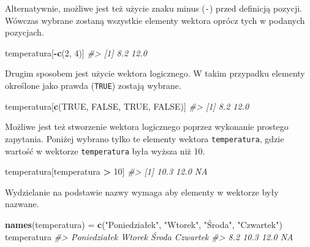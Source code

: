 \documentclass[paper=6in:9in,pagesize=pdftex,headinclude=on,footinclude=on,10pt]{scrbook}
\newenvironment{Shaded}{\begin{snugshade}}{\end{snugshade}}
\newcommand{\CommentTok}[1]{\textcolor[rgb]{0.56,0.35,0.01}{\textit{#1}}}
\newcommand{\DecValTok}[1]{\textcolor[rgb]{0.00,0.00,0.81}{#1}}
\newcommand{\KeywordTok}[1]{\textcolor[rgb]{0.13,0.29,0.53}{\textbf{#1}}}
\newcommand{\NormalTok}[1]{#1}
\newcommand{\OperatorTok}[1]{\textcolor[rgb]{0.81,0.36,0.00}{\textbf{#1}}}
\newcommand{\OtherTok}[1]{\textcolor[rgb]{0.56,0.35,0.01}{#1}}
\newcommand{\StringTok}[1]{\textcolor[rgb]{0.31,0.60,0.02}{#1}}
\begin{document}
Alternatywnie, możliwe jest też użycie znaku minus (\texttt{-}) przed definicją pozycji.
Wówczas wybrane zostaną wszystkie elementy wektora oprócz tych w podanych pozycjach.

\begin{Shaded}
\begin{Highlighting}[]
\NormalTok{temperatura[}\OperatorTok{-}\KeywordTok{c}\NormalTok{(}\DecValTok{2}\NormalTok{, }\DecValTok{4}\NormalTok{)]}
\CommentTok{#> [1]  8.2 12.0}
\end{Highlighting}
\end{Shaded}

Drugim sposobem jest użycie wektora logicznego.
W takim przypadku elementy określone jako prawda (\texttt{TRUE}) zostają wybrane.

\begin{Shaded}
\begin{Highlighting}[]
\NormalTok{temperatura[}\KeywordTok{c}\NormalTok{(}\OtherTok{TRUE}\NormalTok{, }\OtherTok{FALSE}\NormalTok{, }\OtherTok{TRUE}\NormalTok{, }\OtherTok{FALSE}\NormalTok{)]}
\CommentTok{#> [1]  8.2 12.0}
\end{Highlighting}
\end{Shaded}

Możliwe jest też stworzenie wektora logicznego poprzez wykonanie prostego zapytania.
Poniżej wybrano tylko te elementy wektora \texttt{temperatura}, gdzie wartość w wektorze \texttt{temperatura} była wyższa niż 10.

\begin{Shaded}
\begin{Highlighting}[]
\NormalTok{temperatura[temperatura }\OperatorTok{>}\StringTok{ }\DecValTok{10}\NormalTok{]}
\CommentTok{#> [1] 10.3 12.0   NA}
\end{Highlighting}
\end{Shaded}

Wydzielanie na podstawie nazwy wymaga aby elementy w wektorze były nazwane.

\begin{Shaded}
\begin{Highlighting}[]
\KeywordTok{names}\NormalTok{(temperatura) =}\StringTok{ }\KeywordTok{c}\NormalTok{(}\StringTok{"Poniedziałek"}\NormalTok{, }\StringTok{"Wtorek"}\NormalTok{, }\StringTok{"Środa"}\NormalTok{, }\StringTok{"Czwartek"}\NormalTok{)}
\NormalTok{temperatura}
\CommentTok{#> Poniedziałek       Wtorek        Środa     Czwartek }
\CommentTok{#>          8.2         10.3         12.0           NA}
\end{Highlighting}
\end{Shaded}
\end{document}
